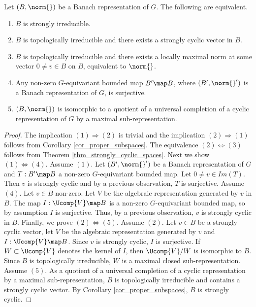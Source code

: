 \begin{thm}\label{Thm_strong_irreducibility}
Let $(B,\norm{})$ be a Banach representation of $G$.
The following are equivalent.
    \begin{enumerate}
    \item $B$ is strongly irreducible.
    \item $B$ is topologically irreducible and there exists a strongly cyclic vector in $B$.
    \item $B$ is topologically irreducible and there exists a locally maximal norm at some vector $0\neq v\in B$ on $B$, equivalent to $\norm{}$.
    \item Any non-zero $G$-equivariant bounded map $B'\map B$, where $(B',\norm{}')$ is a Banach representation of $G$, is surjective.
    \item $(B,\norm{})$ is isomorphic to a quotient of a universal completion of a cyclic representation of $G$ by a maximal sub-representation.
    \end{enumerate}
\end{thm} 
    \begin{proof}
    The implication $(1)\Rightarrow (2)$ is trivial and the implication $(2)\Rightarrow(1)$ follows from Corollary \ref{cor_proper_subspaces}.
    The equivalence $(2)\iff (3)$ follows from Theorem \ref{thm_strongly_cyclic_spaces}.
    Next we show $(1)\iff(4)$.
    Assume $(1)$. 
    Let $(B',\norm{}')$ be a Banach representation of $G$ and $T:B'\map B$ a non-zero $G$-equivariant bounded map.
    Let $0\neq v\in Im(T)$.
    Then $v$ is strongly cyclic and by a previous observation, $T$ is surjective.
    Assume $(4)$.
    Let $v\in B$ non-zero.
    Let $V$ be the algebraic representation generated by $v$ in $B$.
    The map $I:\Ucomp{V}\map B$ is a non-zero $G$-equivariant bounded map, so by assumption $I$ is surjective.
    Thus, by a previous observation, $v$ is strongly cyclic in $B$.
    Finally, we prove $(2)\iff (5)$.
    Assume $(2)$.
    Let $v\in B$ be a strongly cyclic vector, let $V$ be the algebraic representation generated by $v$ and $I:\Ucomp{V}\map B$.
    Since $v$ is strongly cyclic, $I$ is surjective.
    If $W\subset\Ucomp{V}$ denotes the kernel of $I$, then $\Ucomp{V}/W$ is isomorphic to $B$.
    Since $B$ is topologically irreducible, $W$ is a maximal closed sub-representation.
    Assume $(5)$.
    As a quotient of a universal completion of a cyclic representation by a maximal sub-representation, $B$ is topologically irreducible and contains a strongly cyclic vector. 
    By Corollary \ref{cor_proper_subspaces}, $B$ is strongly cyclic.
    \end{proof} 

